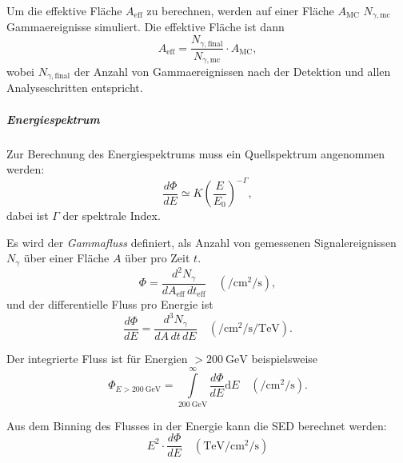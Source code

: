 Um die effektive Fläche $A_{\text{eff}}$ zu berechnen,
werden auf einer Fläche $A_{\text{MC}}$ $N_{\gamma,\text{mc}}$ Gammaereignisse simuliert.
Die effektive Fläche ist dann
\begin{equation}%
  \label{eq:effective_area}
  A_{\text{eff}} =
    \frac{N_{\gamma,\text{final}}}{N_{\gamma,\text{mc}}}
    \cdot A_{\text{MC}} ,
\end{equation}
wobei $N_{\gamma,\text{final}}$ der Anzahl von Gammaereignissen nach der Detektion
und allen Analyseschritten entspricht.



\subparagraph{Energiespektrum}

Zur Berechnung des Energiespektrums muss ein Quellspektrum angenommen werden:
\begin{equation}%
  \label{eq:photon_index}
  \frac{d\Phi}{dE} \simeq K {\left(\frac{E}{E_0}\right)}^{-\Gamma},
\end{equation}
dabei ist $\Gamma$ der spektrale Index.

Es wird der \textit{Gammafluss} definiert,
als Anzahl von gemessenen Signalereignissen $N_{\gamma}$
über
einer Fläche $A$ über pro Zeit $t$.
\begin{equation}%
  \label{eq:gamma_flux}
  \Phi = \frac{d^2 N_{\gamma}}{dA_{\text{eff}}\, dt_{\text{eff}}}
  \quad \left(\si{\per\centi\meter\tothe2\per\second}\right),
\end{equation}
und der differentielle Fluss pro Energie ist
\begin{equation}%
  \label{eq:differential_energy_spectrum}
  \frac{d\Phi}{dE} = \frac{d^3N_{\gamma}}{dA\, dt\, dE}
  \quad \left(\si{\per\centi\meter\tothe2\per\second\per\tera\electronvolt}\right).
\end{equation}

Der integrierte Fluss ist für Energien $> \SI{200}{\giga\electronvolt}$
beispielsweise
\begin{equation}%
  \label{eq:integral_flux}
  \Phi_{E > \SI{200}{\giga\electronvolt}} =
    \int\limits_{\SI{200}{\giga\electronvolt}}^{\infty} \frac{d \Phi}{dE}
    \text{d} E
  \quad \left(\si{\per\centi\meter\tothe2\per\second}\right).
\end{equation}

Aus dem Binning des Flusses in der Energie
kann die SED berechnet werden:
\begin{equation}%
  \label{eq:spectral_energy_distribution}
  E^2 \cdot \frac{d \Phi}{dE}
  \quad \left(\si{\tera\electronvolt\per\centi\meter\tothe2\per\second}\right)
\end{equation}

